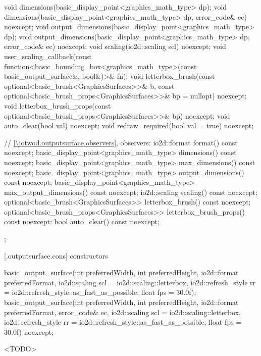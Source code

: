 \begin{codeblock}
{{    void dimensions(basic_display_point<graphics_math_type> dp);
    void dimensions(basic_display_point<graphics_math_type> dp, error_code& ec) noexcept;
    void output_dimensions(basic_display_point<graphics_math_type> dp);
    void output_dimensions(basic_display_point<graphics_math_type> dp, 
      error_code& ec) noexcept;
    void scaling(io2d::scaling scl) noexcept;
    void user_scaling_callback(const
      function<basic_bounding_box<graphics_math_type>(const basic_output_surface&, bool&)>& fn);
    void letterbox_brush(const optional<basic_brush<GraphicsSurfaces>>& b,
      const optional<basic_brush_props<GraphicsSurfaces>>& bp = nullopt) noexcept;
    void letterbox_brush_props(const optional<basic_brush_props<GraphicsSurfaces>>& bp) noexcept;
    void auto_clear(bool val) noexcept;
    void redraw_required(bool val = true) noexcept;
	
    // \ref{\iotwod.outputsurface.observers}, observers:
    io2d::format format() const noexcept;
    basic_display_point<graphics_math_type> dimensions() const noexcept;
    basic_display_point<graphics_math_type> max_dimensions() const noexcept;
    basic_display_point<graphics_math_type> output_dimensions() const noexcept;
    basic_display_point<graphics_math_type> max_output_dimensions() const noexcept;
    io2d::scaling scaling() const noexcept;
    optional<basic_brush<GraphicsSurfaces>> letterbox_brush() const noexcept;
    optional<basic_brush_props<GraphicsSurfaces>> letterbox_brush_props() const noexcept;
    bool auto_clear() const noexcept;
  };
}
\end{codeblock}

 [\iotwod.outputsurface.cons] { constructors}

%
\begin{itemdecl}
basic_output_surface(int preferredWidth, int preferredHeight,
  io2d::format preferredFormat,
  io2d::scaling scl = io2d::scaling::letterbox,
  io2d::refresh_style rr = io2d::refresh_style::as_fast_as_possible,
  float fps = 30.0f);
basic_output_surface(int preferredWidth, int preferredHeight,
  io2d::format preferredFormat,
  error_code& ec, io2d::scaling scl = io2d::scaling::letterbox,
  io2d::refresh_style rr = io2d::refresh_style::as_fast_as_possible,
  float fps = 30.0f) noexcept;
\end{itemdecl}
\begin{itemdescr}
\pnum
<TODO>
\end{itemdescr}

